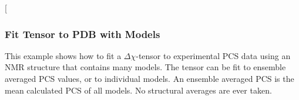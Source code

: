 \documentclass[a4paper,10pt,english]{sphinxmanual}
\begin{document}
%
\begin{sphinxVerbatim}[commandchars=\\\{\}]
           
           
              
               
               
                
                
                 
               
              
                  
               
                 
\end{sphinxVerbatim}


{[}\sphinxcode{\sphinxupquote{pcs\_fit\_multiple.png}}{]}

\noindent{}


\subsubsection{Fit Tensor to PDB with Models}
\label{\detokenize{examples/pcs_fit_models:fit-tensor-to-pdb-with-models}}\label{\detokenize{examples/pcs_fit_models:pcs-fit-models}}\label{\detokenize{examples/pcs_fit_models::doc}}
This example shows how to fit a \({\Delta\chi}\)-tensor to experimental PCS data using an NMR structure that contains many models. The tensor can be fit to ensemble averaged PCS values, or to individual models. An ensemble averaged PCS is the mean calculated PCS of all models. No structural averages are ever taken.
\end{document}
